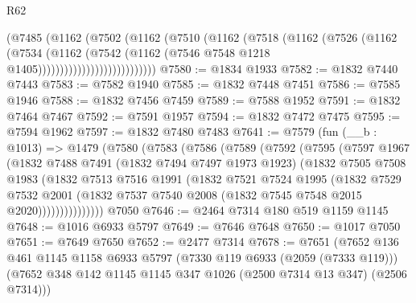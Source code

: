 \begin{lexlean}{R62}
\begin{coremodule}
                            (@7485
                              (@1162
                                (@7502
                                  (@1162
                                    (@7510
                                      (@1162
                                        (@7518
                                          (@1162
                                            (@7526
                                              (@1162
                                                (@7534
                                                  (@1162
                                                    (@7542
                                                      (@1162
                                                        (@7546
                                                          @7548
                                                          @1218
                                                          @1405)))))))))))))))))))))))))))
@7580 := @1834 @1933
@7582 := @1832 @7440 @7443
@7583 := @7582 @1940
@7585 := @1832 @7448 @7451
@7586 := @7585 @1946
@7588 := @1832 @7456 @7459
@7589 := @7588 @1952
@7591 := @1832 @7464 @7467
@7592 := @7591 @1957
@7594 := @1832 @7472 @7475
@7595 := @7594 @1962
@7597 := @1832 @7480 @7483
@7641 := @7579
    (fun (__b : @1013) =>
    @1479
      (@7580
        (@7583
          (@7586
            (@7589
              (@7592
                (@7595
                  (@7597
                    @1967
                    (@1832
                      @7488
                      @7491
                      (@1832 @7494 @7497 @1973 @1923)
                      (@1832
                        @7505
                        @7508
                        @1983
                        (@1832
                          @7513
                          @7516
                          @1991
                          (@1832
                            @7521
                            @7524
                            @1995
                            (@1832
                              @7529
                              @7532
                              @2001
                              (@1832 @7537 @7540 @2008 (@1832 @7545 @7548 @2015 @2020)))))))))))))))
    @7050
@7646 := @2464 @7314 @180 @519 @1159 @1145
@7648 := @1016 @6933 @5797
@7649 := @7646 @7648
@7650 := @1017 @7050
@7651 := @7649 @7650
@7652 := @2477 @7314
@7678 := @7651
    (@7652
      @136
      @461
      @1145
      @1158
      @6933
      @5797
      (@7330 @119 @6933 (@2059 (@7333 @119)))
      (@7652 @348 @142 @1145 @1145 @347 @1026 (@2500 @7314 @13 @347) (@2506 @7314)))

\end{coremodule}
\end{lexlean}
